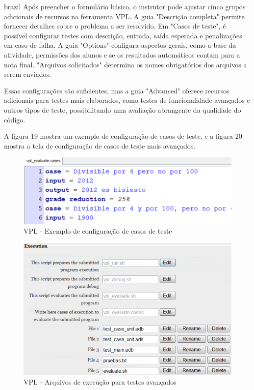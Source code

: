 \begin{otherlanguage*}{brazil}
Após preencher o formulário básico, o instrutor pode ajustar cinco grupos adicionais de recursos na ferramenta VPL. A guia "Descrição completa" permite fornecer detalhes sobre o problema a ser resolvido. Em "Casos de teste", é possível configurar testes com descrição, entrada, saída esperada e penalizações em caso de falha. A guia "Options" configura aspectos gerais, como a base da atividade, permissões dos alunos e se os resultados automáticos contam para a nota final. "Arquivos solicitados" determina os nomes obrigatórios dos arquivos a serem enviados. 

Essas configurações são suficientes, mas a guia "Advanced" oferece recursos adicionais para testes mais elaborados, como testes de funcionalidade avançados e outros tipos de teste, possibilitando uma avaliação abrangente da qualidade do código.

A figura 19 mostra um exemplo de configuração de casos de teste, e a figura 20 mostra a tela de configuração de casos de teste mais avançados.

\begin{figure}[h!]
	   \centering
            \caption{VPL - Exemplo de configuração de casos de teste}
            \label{fig:ModeloConceitual}
	   	\includegraphics[scale=0.3]{pictures/VPL_testes.png}
\end{figure}

\begin{figure}[h!]
	   \centering
            \caption{VPL - Arquivos de execução para testes avançados}
            \label{fig:ModeloConceitual}
	   	\includegraphics[scale=0.3]{pictures/VPL_testes_avancados.png}
\end{figure}


\end{otherlanguage*}
